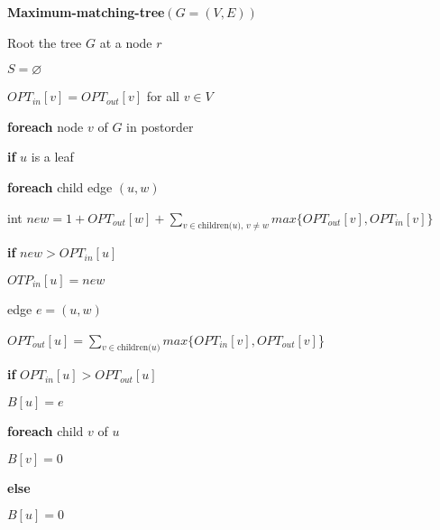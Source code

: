 \documentclass{article}
\begin{document}
\vspace{5mm}

\textbf{Maximum-matching-tree}$(G = (V,E))$
\begin{enumerate}
    \item Root the tree $G$ at a node $r$
    \item $S = \varnothing$
    \item $OPT_{in}[v] = OPT_{out}[v]$ for all $v \in V$
    \item \textbf{foreach} node $v$ of $G$ in postorder
    {\setlength\itemindent{25pt} \item \textbf{if} $u$ is a leaf }
    {\setlength\itemindent{50pt} \item \textbf{foreach} child edge $(u,w)$ }
    {\setlength\itemindent{75pt} \item int $new = 1 + OPT_{out}[w] +
        \sum_{v \in \text{children($u$), $v \neq w$}} max\{OPT_{out}[v],
        OPT_{in}[v]\}$ }
    {\setlength\itemindent{75pt} \item \textbf{if} $new > OPT_{in}[u]$ }
    {\setlength\itemindent{100pt} \item $OTP_{in}[u] = new$ }
    {\setlength\itemindent{100pt} \item edge $e = (u,w)$ }
    {\setlength\itemindent{50pt} \item $OPT_{out}[u] =
        \sum_{v \in \text{children($u$)}} max\{OPT_{in}[v], OPT_{out}[v]$\} }
    {\setlength\itemindent{50pt} \item \textbf{if} $OPT_{in}[u] > OPT_{out}[u]$ }
    {\setlength\itemindent{75pt} \item $B[u] = e$ }
    {\setlength\itemindent{75pt} \item \textbf{foreach} child $v$ of $u$ }
    {\setlength\itemindent{100pt} \item $B[v] = 0$ }
    {\setlength\itemindent{50pt} \item \textbf{else} }
    {\setlength\itemindent{75pt} \item $B[u] = 0$ }
\end{enumerate}
\end{document}
